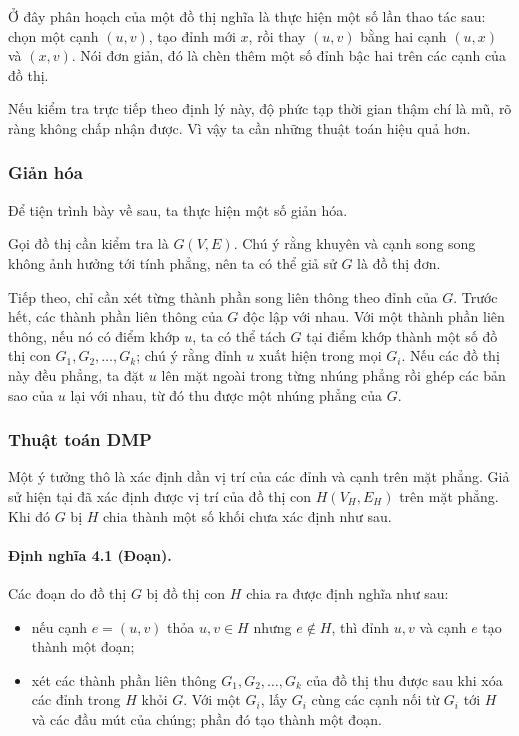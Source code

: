 \documentclass[11pt]{article}
\begin{document}
Ở đây phân hoạch của một đồ thị nghĩa là thực hiện một số lần thao tác sau:
chọn một cạnh $(u,v)$, tạo đỉnh mới $x$, rồi thay $(u,v)$ bằng hai cạnh
$(u,x)$ và $(x,v)$. Nói đơn giản, đó là chèn thêm một số đỉnh bậc hai trên các
cạnh của đồ thị.

Nếu kiểm tra trực tiếp theo định lý này, độ phức tạp thời gian thậm chí là mũ,
rõ ràng không chấp nhận được. Vì vậy ta cần những thuật toán hiệu quả hơn.

\subsubsection{Giản hóa}

Để tiện trình bày về sau, ta thực hiện một số giản hóa.

Gọi đồ thị cần kiểm tra là $G(V,E)$. Chú ý rằng khuyên và cạnh song song không
ảnh hưởng tới tính phẳng, nên ta có thể giả sử $G$ là đồ thị đơn.

Tiếp theo, chỉ cần xét từng thành phần song liên thông theo đỉnh của $G$. Trước
hết, các thành phần liên thông của $G$ độc lập với nhau. Với một thành phần
liên thông, nếu nó có điểm khớp $u$, ta có thể tách $G$ tại điểm khớp thành một
số đồ thị con $G_1,G_2,\ldots,G_k$; chú ý rằng đỉnh $u$ xuất hiện trong mọi
$G_i$. Nếu các đồ thị này đều phẳng, ta đặt $u$ lên mặt ngoài trong từng nhúng
phẳng rồi ghép các bản sao của $u$ lại với nhau, từ đó thu được một nhúng phẳng
của $G$.

\subsubsection{Thuật toán DMP}

Một ý tưởng thô là xác định dần vị trí của các đỉnh và cạnh trên mặt phẳng.
Giả sử hiện tại đã xác định được vị trí của đồ thị con $H(V_H,E_H)$ trên mặt
phẳng. Khi đó $G$ bị $H$ chia thành một số khối chưa xác định như sau.

\paragraph{Định nghĩa 4.1 (Đoạn).}
Các đoạn do đồ thị $G$ bị đồ thị con $H$ chia ra được định nghĩa như sau:
\begin{itemize}
  \item nếu cạnh $e=(u,v)$ thỏa $u,v\in H$ nhưng $e\notin H$, thì đỉnh $u,v$ và
  cạnh $e$ tạo thành một đoạn;
  \item xét các thành phần liên thông $G_1,G_2,\ldots,G_k$ của đồ thị thu được
  sau khi xóa các đỉnh trong $H$ khỏi $G$. Với một $G_i$, lấy $G_i$ cùng các
  cạnh nối từ $G_i$ tới $H$ và các đầu mút của chúng; phần đó tạo thành một
  đoạn.
\end{itemize}
\end{document}
